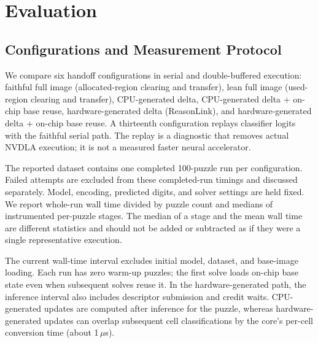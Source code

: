 \section{Evaluation}
\label{sec:eval}
\subsection{Configurations and Measurement Protocol}
We compare six handoff configurations in serial and double-buffered execution: faithful full image (allocated-region clearing and transfer), lean full image (used-region clearing and transfer), CPU-generated delta, CPU-generated delta + on-chip base reuse, hardware-generated delta (ReasonLink), and hardware-generated delta + on-chip base reuse. A thirteenth configuration replays classifier logits with the faithful serial path. The replay is a diagnostic that removes actual NVDLA execution; it is not a measured faster neural accelerator.

The reported dataset contains one completed 100-puzzle run per configuration. Failed attempts are excluded from these completed-run timings and discussed separately. Model, encoding, predicted digits, and solver settings are held fixed. We report whole-run wall time divided by puzzle count and medians of instrumented per-puzzle stages. The median of a stage and the mean wall time are different statistics and should not be added or subtracted as if they were a single representative execution.

The current wall-time interval excludes initial model, dataset, and base-image loading. Each run has zero warm-up puzzles; the first solve loads on-chip base state even when subsequent solves reuse it. In the hardware-generated path, the inference interval also includes descriptor submission and credit waits. CPU-generated updates are computed after inference for the puzzle, whereas hardware-generated updates can overlap subsequent cell classifications by the core's per-cell conversion time (about 1\,$\mu$s).


